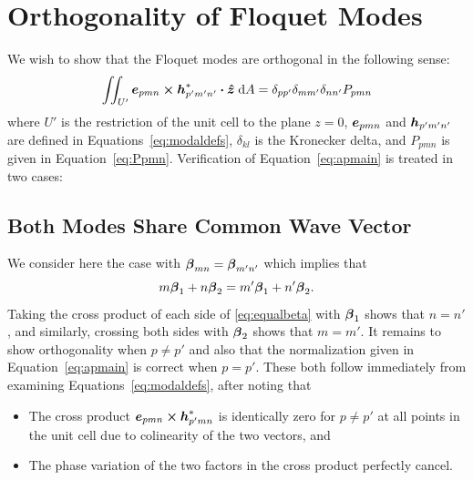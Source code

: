 \documentclass[
letterpaper, %
11pt, %
oneside, 
onecolumn, %
openany, %
]{memoir}
\numberwithin{equation}{chapter}
\numberwithin{figure}{chapter}
\renewcommand{\theequation}{\arabic{chapter}.\arabic{equation}}
\begin{document}
\mainmatter











\appendix
\renewcommand{\theequation}{\Alph{chapter}.\arabic{equation}}

\chapter{Orthogonality of Floquet Modes}

\label{app:orthogonal}
We wish to show that the Floquet modes are orthogonal in the following
sense:
\begin{equation}
  \label{eq:apmain}
  \iint_{U'}
  \boldsymbol{e}_{pmn} \boldsymbol{\times} \boldsymbol{h}_{p'm'n'}^* \boldsymbol{\cdot} \boldsymbol{\hat{z}} \; \text{d} A  
    = \delta_{pp'} \delta_{mm'} \delta_{nn'} P_{pmn} 
\end{equation}
where $U'$ is the restriction of the unit cell to the plane $z=0$,
$\boldsymbol{e}_{pmn}$ and $\boldsymbol{h}_{p'm'n'}$ are defined in
Equations~\eqref{eq:modaldefs}, 
$\delta_{kl}$ is the Kronecker delta, and $P_{pmn}$ 
is given in Equation~\eqref{eq:Ppmn}.
Verification of Equation~\eqref{eq:apmain} is treated in two cases:



\section{Both Modes Share Common Wave Vector}
We consider here the case with 
$\boldsymbol{\beta}_{mn}= \boldsymbol{\beta}_{m'n'}$
which implies that
\begin{equation}
  m\boldsymbol{\beta}_1 + n\boldsymbol{\beta}_2 = m'\boldsymbol{\beta}_1 + n'\boldsymbol{\beta}_2.
  \label{eq:equalbeta}
\end{equation}
Taking the cross product of each side of \eqref{eq:equalbeta} with
$\boldsymbol{\beta}_1$ shows that $n=n'$, and similarly, crossing both sides
with $\boldsymbol{\beta}_2$ shows that $m=m'$.
It remains to show orthogonality when $p\neq p'$ and also
that the normalization given in Equation~\eqref{eq:apmain} is
correct when $p=p'$.  These both follow immediately from examining
Equations~\eqref{eq:modaldefs}, after noting that 
\begin{itemize}
\item The cross product 
  $\boldsymbol{e}_{pmn} \boldsymbol{\times} \boldsymbol{h}_{p'mn}^*$ is identically zero for $p\neq p'$ 
  at all points in the unit cell due to colinearity of the two vectors,
  and
\item The phase variation of the two factors in the cross product
  perfectly cancel.
\end{itemize}
\end{document}
